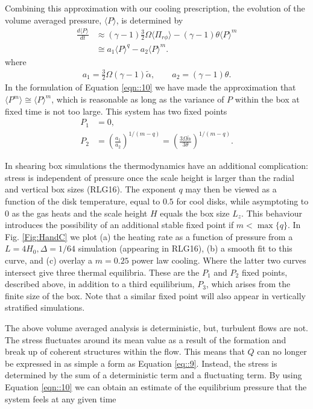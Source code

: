 \documentclass[useAMS]{mn2e}
\begin{document}
Combining this approximation with our cooling prescription,
the evolution of the volume averaged pressure, $\langle P\rangle$, is determined by
\begin{align}
\label{eqn::10}
\frac{d\langle P\rangle}{dt}&\approx\left(\gamma-1\right)\frac{3}{2}\Omega\langle\Pi_{r\phi}\rangle-(\gamma-1)\theta \langle P\rangle^{m} \\ 
&\cong a_1\langle P\rangle^{q}-a_2 \langle P\rangle^{m}.
\label{eqn::11}
\end{align}
where 
\begin{align}
a_1=\frac{3}{2}\Omega(\gamma-1)\tilde{\alpha}, \qquad a_2=(\gamma-1)\theta.
\end{align}
In the formulation of Equation \eqref{eqn::10} we have made the
approximation that $\langle P^{m}\rangle\cong\langle P\rangle^{m}$,
which is reasonable as long as the variance of $P$ within the box at
fixed time is not too large. This system has two fixed points 
\begin{align}
P_{1}&=0, \\
P_{2}&=\left(\frac{a_{1}}{a_{2}}\right)^{1/(m-q)}=\left(\frac{3\Omega\tilde{\alpha}}{3\theta}\right)^{1/(m-q)}.
\end{align} 

In shearing box simulations the thermodynamics have an additional
complication: stress is independent of pressure once the scale height
is larger than the radial and vertical box sizes (RLG16). The exponent
$q$ may then be viewed as a function of the disk temperature, equal to
$0.5$ for cool disks, while asymptoting to 0 as the gas heats and the
scale height $H$ equals the box size $L_z$. 
This behaviour introduces the possibility of
an additional stable fixed point if $m<\max\{q\}$. In Fig.
\ref{Fig:HandC} we plot (a) the heating rate as a function of pressure from a $L=4H_{0},
\Delta=1/64$ simulation (appearing in RLG16), (b) a smooth fit to
this curve, and (c)
overlay a $m=0.25$ power law cooling. Where the latter two curves
intersect
 give three thermal equilibria. These are the $P_1$ and $P_2$ fixed
 points, described above, in addition to a
third equilibrium, $P_3$, which arises from the finite size of the
box. 
Note that a similar fixed point
will also appear in vertically stratified simulations.

The above volume averaged analysis is deterministic, but, turbulent
flows are not. The stress fluctuates around its mean value as a result
of the formation and break up of coherent structures within the
flow. This means that $Q$ can no longer be expressed in as simple a
form as Equation \eqref{eq::9}. Instead, the stress is determined by the
sum of a deterministic term and a fluctuating term. By using Equation
\eqref{eqn::10} we can obtain an estimate of the equilibrium pressure
that the system feels at any given time
\end{document}
